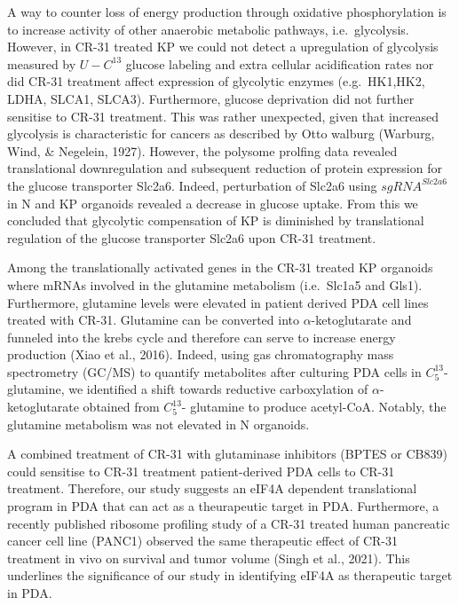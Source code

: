 \documentclass[
  12pt,
  openany]{book}
\begin{document}
A way to counter loss of energy production through oxidative phosphorylation is to increase activity of other anaerobic metabolic pathways, i.e.~glycolysis. However, in CR-31 treated KP we could not detect a upregulation of glycolysis measured by \(U-C^{13}\) glucose labeling and extra cellular acidification rates nor did CR-31 treatment affect expression of glycolytic enzymes (e.g.~HK1,HK2, LDHA, SLCA1, SLCA3). Furthermore, glucose deprivation did not further sensitise to CR-31 treatment. This was rather unexpected, given that increased glycolysis is characteristic for cancers as described by Otto walburg (Warburg, Wind, \& Negelein, 1927). However, the polysome prolfing data revealed translational downregulation and subsequent reduction of protein expression for the glucose transporter Slc2a6. Indeed, perturbation of Slc2a6 using \(sgRNA^{Slc2a6}\) in N and KP organoids revealed a decrease in glucose uptake. From this we concluded that glycolytic compensation of KP is diminished by translational regulation of the glucose transporter Slc2a6 upon CR-31 treatment.

Among the translationally activated genes in the CR-31 treated KP organoids where mRNAs involved in the glutamine metabolism (i.e.~Slc1a5 and Gls1). Furthermore, glutamine levels were elevated in patient derived PDA cell lines treated with CR-31. Glutamine can be converted into \(\alpha\)-ketoglutarate and funneled into the krebs cycle and therefore can serve to increase energy production (Xiao et al., 2016). Indeed, using gas chromatography mass spectrometry (GC/MS) to quantify metabolites after culturing PDA cells in \(C_5^{13}\)- glutamine, we identified a shift towards reductive carboxylation of \(\alpha\)-ketoglutarate obtained from \(C_5^{13}\)- glutamine to produce acetyl-CoA. Notably, the glutamine metabolism was not elevated in N organoids.

A combined treatment of CR-31 with glutaminase inhibitors (BPTES or CB839) could sensitise to CR-31 treatment patient-derived PDA cells to CR-31 treatment. Therefore, our study suggests an eIF4A dependent translational program in PDA that can act as a theurapeutic target in PDA. Furthermore, a recently published ribosome profiling study of a CR-31 treated human pancreatic cancer cell line (PANC1) observed the same therapeutic effect of CR-31 treatment in vivo on survival and tumor volume (Singh et al., 2021). This underlines the significance of our study in identifying eIF4A as therapeutic target in PDA.
\end{document}
